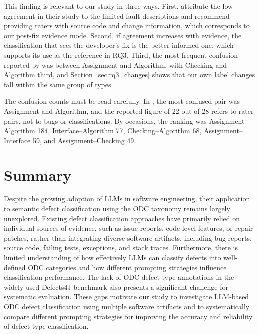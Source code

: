 \documentclass{iutbscthesis}
\begin{document}
This finding is relevant to our study in three ways. First, \textcite{henningsson2004assuring} attribute the low agreement in their study to the limited fault descriptions and recommend providing raters with source code and change information, which corresponds to our post-fix evidence mode. Second, if agreement increases with evidence, the classification that sees the developer's fix is the better-informed one, which supports its use as the reference in RQ3. Third, the most frequent confusion reported by \textcite{henningsson2004assuring} was between Assignment and Algorithm, with Checking and Algorithm third, and Section~\ref{sec:rq3_changes} shows that our own label changes fall within the same group of types.

The confusion counts must be read carefully. In \textcite{henningsson2004assuring}, the most-confused pair was Assignment and Algorithm, and the reported figure of 22 out of 28 refers to rater pairs, not to bugs or classifications. By occasions, the ranking was Assignment--Algorithm 184, Interface--Algorithm 77, Checking--Algorithm 68, Assignment--Interface 59, and Assignment--Checking 49.

\section{Summary}

Despite the growing adoption of LLMs in software engineering, their application to semantic defect classification using the ODC taxonomy remains largely unexplored. Existing defect classification approaches have primarily relied on individual sources of evidence, such as issue reports, code-level features, or repair patches, rather than integrating diverse software artifacts, including bug reports, source code, failing tests, exceptions, and stack traces. Furthermore, there is limited understanding of how effectively LLMs can classify defects into well-defined ODC categories and how different prompting strategies influence classification performance. The lack of ODC defect-type annotations in the widely used Defects4J benchmark also presents a significant challenge for systematic evaluation. These gaps motivate our study to investigate LLM-based ODC defect classification using multiple software artifacts and to systematically compare different prompting strategies for improving the accuracy and reliability of defect-type classification.


\end{document}
